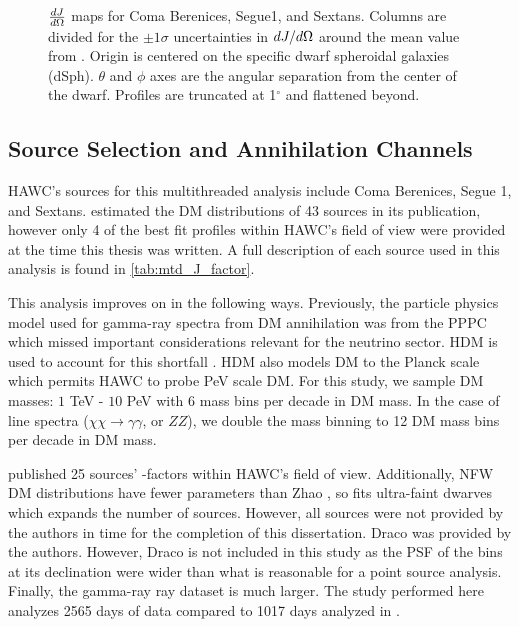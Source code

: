\begin{figure}[t]
{\begin{tabular}{cccc}
    \end{tabular}
    }
    \caption{$\frac{dJ}{d\Omega}$ maps for Coma Berenices, Segue1, and Sextans. Columns are divided for the $\pm1 \sigma$ uncertainties in $dJ/d\Omega$ around the mean value from \LS \cite{DM_Strigari20}. Origin is centered on the specific dwarf spheroidal galaxies (dSph). $\theta$ and $\phi$ axes are the angular separation from the center of the dwarf. Profiles are truncated at 1$^\circ$ and flattened beyond.}
    \label{fig:ls20_jfac_maps}
\end{figure}

\subsection{Source Selection and Annihilation Channels}\label{sec:mtd_srcs_y_chan}

HAWC's sources for this multithreaded analysis include Coma Berenices, Segue 1, and Sextans.
\LS estimated the DM distributions of 43 sources in its publication, however only 4 of the best fit profiles within HAWC's field of view were provided at the time this thesis was written.
A full description of each source used in this analysis is found in \cref{tab:mtd_J_factor}.



This analysis improves on  in the following ways.
Previously, the particle physics model used for gamma-ray spectra from DM annihilation was from the PPPC \cite{Cirelli_2011} which missed important considerations relevant for the neutrino sector.
HDM is used to account for this shortfall \cite{Rodd:HDM_spec}.
HDM also models DM to the Planck scale which permits HAWC to probe PeV scale DM.
For this study, we sample DM masses: $1$ TeV - $10$ PeV with 6 mass bins per decade in DM mass.
In the case of line spectra ($\chi\chi \rightarrow \gamma\gamma$, or $ZZ$), we double the mass binning to 12 DM mass bins per decade in DM mass.

\LS published 25 sources' \J-factors within HAWC's field of view.
Additionally, NFW \cite{NFWProfile} DM distributions have fewer parameters than Zhao \cite{Zhao:1995cp}, so \LS fits ultra-faint dwarves which expands the number of sources.
However, all sources were not provided by the authors in time for the completion of this dissertation.
Draco was provided by the authors.
However, Draco is not included in this study as the PSF of the bins at its declination were wider than what is reasonable for a point source analysis.
Finally, the gamma-ray ray dataset is much larger.
The study performed here analyzes 2565 days of data compared to 1017 days analyzed in .


